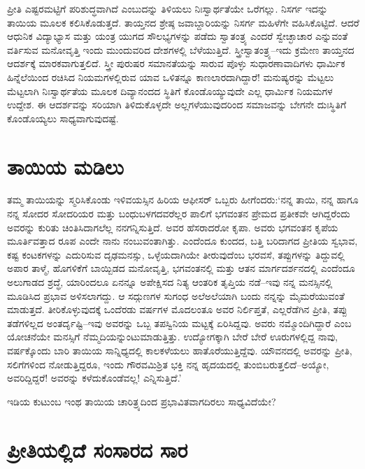 ಪ್ರೀತಿ ಎಷ್ಟರಮಟ್ಟಿಗೆ ಪರಿಶುದ್ಧವಾಗಿದೆ ಎಂಬುದನ್ನು ತಿಳಿಯಲು ನಿಃಸ್ವಾರ್ಥತೆಯೇ ಒರೆಗಲ್ಲು. ನಿಸರ್ಗ ಇದನ್ನು ತಾಯಿಯ ಮೂಲಕ ಕಲಿಸಿಕೊಡುತ್ತದೆ. ತಾಯ್ತನದ ಶ್ರೇಷ್ಠ ಜವಾಬ್ದಾರಿಯನ್ನು ನಿಸರ್ಗ ಮಹಿಳೆಗೇ ವಹಿಸಿಕೊಟ್ಟಿದೆ. ಆದರೆ ಆಧುನಿಕ ವಿದ್ಯಾಭ್ಯಾಸ ಮತ್ತು ಯಂತ್ರ ಯುಗದ ಸೌಲಭ್ಯಗಳನ್ನು ಪಡೆದು ಸ್ವಾತಂತ್ರ್ಯ ಎಂದರೆ ಸ್ವೇಚ್ಛಾಚಾರ ಎನ್ನುವಂತೆ ವರ್ತಿಸುವ ಮನೋವೃತ್ತಿ ಇಂದು ಮುಂದುವರಿದ ದೇಶಗಳಲ್ಲಿ ಬೆಳೆಯುತ್ತಿದೆ. ಸ್ತ್ರೀಸ್ವಾತಂತ್ರ್ಯ–ಇದು ಕ್ರಮೇಣ ತಾಯ್ತನದ ಆದರ್ಶಕ್ಕೆ ಮಾರಕವಾಗುತ್ತಲಿದೆ. ಸ್ತ್ರೀ ಪುರುಷರ ಸಮಾನತೆಯನ್ನು ಸಾರುವ ಪೊಳ್ಳು ಸುಧಾರಣಾವಾದಿಗಳು ಧಾರ್ಮಿಕ ಹಿನ್ನೆಲೆಯಿಂದ ರಚಿಸಿದ ನಿಯಮಗಳಲ್ಲಿರುವ ಯಾವ ಒಳಿತನ್ನೂ ಕಾಣಲಾರದಾಗಿದ್ದಾರೆ! ಮನುಷ್ಯರನ್ನು ಮೆಟ್ಟಲು ಮೆಟ್ಟಲಾಗಿ ನಿಃಸ್ವಾರ್ಥತೆಯ ಮೂಲಕ ದಿವ್ಯಾ\-ನಂದದ ಸ್ಥಿತಿಗೆ ಕೊಂಡೊಯ್ಯುವುದೇ ಎಲ್ಲ ಧಾರ್ಮಿಕ ನಿಯಮಗಳ ಉದ್ದೇಶ. ಈ ಆದರ್ಶವನ್ನು ಸರಿಯಾಗಿ ತಿಳಿದುಕೊಳ್ಳದೇ ಅಲ್ಲಗಳೆಯುವುದರಿಂದ ಸಮಾಜವನ್ನು ಬೇಗನೇ ದುಃಸ್ಥಿತಿಗೆ ಕೊಂಡೊಯ್ಯಲು ಸಾಧ್ಯವಾಗುವುದಷ್ಟೆ.


\section*{ತಾಯಿಯ ಮಡಿಲು}


ತಮ್ಮ ತಾಯಿಯನ್ನು ಸ್ಮರಿಸಿಕೊಂಡು ಇಳಿವಯಸ್ಸಿನ ಹಿರಿಯ ಆಫೀಸರ್​ ಒಬ್ಬರು ಹೀಗೆಂದರು:‘ನನ್ನ ತಾಯಿ, ನನ್ನ ಹಾಗೂ ನನ್ನ ಸೋದರ ಸೋದರಿಯರ ಮತ್ತು ಬಂಧುಬಳಗದವರೆಲ್ಲರ ಪಾಲಿಗೆ ಭಗವಂತನ ಪ್ರೇಮದ ಪ್ರತೀಕವೇ ಆಗಿದ್ದರೆಂದು ಅವರನ್ನು ಕುರಿತು ಚಿಂತಿಸಿದಾಗಲೆಲ್ಲ ನನಗನ್ನಿಸು\-ತ್ತಿದೆ. ಅವರ ಹೆಸರಾದರೋ ಕೃಪಾ. ಅವರು ಭಗವಂತನ ಕೃಪೆಯ ಮೂರ್ತಿವತ್ತಾದ ರೂಪ ಎಂದೇ ನಾನು ನಂಬುವಂತಾಗಿತ್ತು. ಎಂದೆಂದೂ ಕುಂದದ, ಬತ್ತಿ ಬರಿದಾಗದ ಪ್ರೀತಿಯ ಸ್ವಭಾವ, ಕಷ್ಟ ಕಂಟಕಗಳನ್ನು ಎದುರಿಸುವ ದೃಢಮನಸ್ಸು, ಒಳ್ಳೆಯದಾಗಿಯೇ ತೀರುವುದೆಂಬ ಭರವಸೆ, ತಪ್ಪುಗಳನ್ನು ತಿದ್ದುವಲ್ಲಿ ಅಪಾರ ತಾಳ್ಮೆ, ಹೊಗಳಿಕೆಗೆ ಬಾಯ್ಬಿಡದ ಮನೋವೃತ್ತಿ, ಭಗವಂತನಲ್ಲಿ ಮತ್ತು ಆತನ ಮಾರ್ಗದರ್ಶನದಲ್ಲಿ ಎಂದೆಂದೂ ಅಲುಗಾಡದ ಶ್ರದ್ಧೆ, ಯಾರಿಂದಲೂ ಏನನ್ನೂ ಅಪೇಕ್ಷಿಸದ ನಿತ್ಯ ಆಂತರಿಕ ತೃಪ್ತಿಯ ನಡೆ–ಇವು ನನ್ನ ಮನಸ್ಸಿನಲ್ಲಿ ಮೂಡಿಸಿದ ಪ್ರಭಾವ ಅಳಿಸಲಾಗದ್ದು. ಆ ಸದ್ಗುಣಗಳ ಸುಗಂಧ ಅಲೆಅಲೆಯಾಗಿ ಬಂದು ನನ್ನನ್ನು ಮೈಮರೆಯುವಂತೆ ಮಾಡುತ್ತದೆ. ತೀರಿಕೊಳ್ಳುವುದಕ್ಕೆ ಒಂದೆರಡು ವರ್ಷಗಳ ಮೊದಲಂತೂ ಅವರ ನಿರ್ಲಿಪ್ತತೆ, ಎಲ್ಲರೆಡೆಗಿನ ಪ್ರೀತಿ, ತಪ್ಪು ತಡೆಗಳಿಲ್ಲದ ಅಂತರ್ದೃಷ್ಟಿ–ಇವು ಅವರನ್ನು ಒಬ್ಬ ತಪಸ್ವಿನಿಯ ಮಟ್ಟಕ್ಕೆ ಏರಿಸಿದ್ದವು. ಅವರು ನಮ್ಮೊಂದಿಗಿದ್ದಾರೆ ಎಂಬ ಯೋಚನೆಯೇ ಮನಸ್ಸಿಗೆ ನೆಮ್ಮದಿಯನ್ನುಂಟು\-ಮಾಡುತ್ತಿತ್ತು. ಉದ್ಯೋಗಕ್ಕಾಗಿ ಬೇರೆ ಬೇರೆ ಊರುಗಳಲ್ಲಿದ್ದ ನಾವು, ವರ್ಷಕ್ಕೊಂದು ಬಾರಿ ತಾಯಿಯ ಸಾನ್ನಿಧ್ಯದಲ್ಲಿ ಕಾಲಕಳೆಯಲು ಹಾತೊರೆಯುತ್ತಿದ್ದೆವು. ಯೌವನದಲ್ಲಿ ಅವರನ್ನು ಪ್ರೀತಿ, ಸಲಿಗೆಗಳಿಂದ ನೋಡುತ್ತಿದ್ದರೂ, ಇಂದು ಗೌರವಮಿಶ್ರಿತ ಭಕ್ತಿ ನನ್ನ ಹೃದಯದಲ್ಲಿ ತುಂಬಿಬರುತ್ತಲಿದೆ–ಅಯ್ಯೋ, ಅವರಿದ್ದಿದ್ದರೆ! ಅವರನ್ನು ಕಳೆದುಕೊಂಡೆವಲ್ಲ! ಎನ್ನಿಸುತ್ತಿದೆ.’

ಇಡಿಯ ಕುಟುಂಬ ಇಂಥ ತಾಯಿಯ ಚಾರಿತ್ರ್ಯದಿಂದ ಪ್ರಭಾವಿತವಾಗದಿರಲು ಸಾಧ್ಯ\-ವಿದೆಯೇ?


\section*{ಪ್ರೀತಿಯಲ್ಲಿದೆ ಸಂಸಾರದ ಸಾರ}

